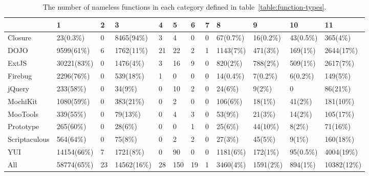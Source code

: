 \documentclass[10pt, preprint]{sigplanconf}
\begin{document}
\begin{table}
\centering
  \begin{tabular}{ | l | l | l | l | l | l | l | l | l | l | l | l |}
  \hline
     & 1 & 2 & 3 & 4 & 5 & 6 & 7 & 8 & 9 & 10 & 11 \\ 
  \hline 
   Closure       & 23(0.3\%)  & 0  & 8465(94\%) & 3  & 4  & 0  & 0 & 67(0.7\%)& 16(0.2\%)& 43(0.5\%)& 365(4\%)\\ 
  \hline 
   DOJO          & 9599(61\%) & 6  & 1762(11\%) & 21 & 22 & 2  & 1 & 1143(7\%)& 471(3\%) & 169(1\%) & 2644(17\%) \\ 
  \hline 
   ExtJS         & 30221(83\%)& 0  & 1476(4\%)  & 3  & 16 & 9  & 0 & 820(2\%) & 788(2\%) & 509(1\%) & 2617(7\%) \\ 
  \hline 
   Firebug       & 2296(76\%) & 0  & 539(18\%)  & 1  & 0  & 0  & 0 & 14(0.4\%)& 7(0.2\%) & 6(0.2\%) & 149(5\%) \\ 
  \hline 
   jQuery        & 233(58\%)  & 0  & 34(9\%)    & 0  & 10 & 2  & 0 & 24(6\%)  & 9(2\%)   & 0        & 86(21\%)  \\ 
  \hline 
   MochiKit      & 1080(59\%) & 0  & 383(21\%)  & 0  & 2  & 0  & 0 & 106(6\%) & 18(1\%)  & 41(2\%)  & 181(10\%) \\ 
  \hline 
   MooTools      & 339(55\%)  & 0  & 79(13\%)   & 0  & 4  & 3  & 0 & 53(9\%)  & 21(3\%)  & 14(2\%)  & 105(17\%) \\ 
  \hline 
   Prototype     & 265(60\%)  & 0  & 28(6\%)    & 0  & 0  & 1  & 0 & 25(6\%)  & 44(10\%) & 8(2\%)   & 71(16\%) \\ 
  \hline 
   Scriptaculous & 564(64\%)  & 0  & 75(8\%)    & 0  & 2  & 2  & 0 & 27(3\%)  & 45(5\%)  & 9(1\%)   & 160(18\%) \\ 
  \hline 
   YUI           & 14154(66\%)& 7  & 1721(8\%)  & 0  & 90 & 0  & 0 & 1181(6\%)& 172(1\%) & 95(0.5\%)& 4004(19\%)\\ 
  \hline 
   All           & 58774(65\%)& 23 & 14562(16\%)& 28 & 150& 19 & 1 & 3460(4\%)& 1591(2\%)& 894(1\%) & 10382(12\%) \\ 
  \hline 
\end{tabular}
\caption{The number of nameless functions in each category defined in table~\ref{table:function-types}.}
\label{function-type-count} 
\end{table} 

 
\end{document}
